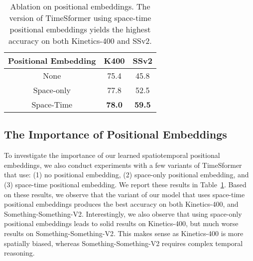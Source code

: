 \documentclass{article}
\begin{document}
 
 \begin{table}
\centering
{\scriptsize
 \begin{tabular}{c c c }
 \hline
{Positional Embedding} & {K400} & {SSv2} \\ 
 \hline
None & 75.4  & 45.8 \\
Space-only & 77.8  & 52.5 \\
Space-Time & \bf 78.0 & \bf 59.5\\
 \hline
 \end{tabular}
 }
  \vspace{-0.1cm}
\caption{Ablation on positional embeddings. The version of TimeSformer using space-time positional embeddings yields the highest accuracy on both Kinetics-400 and SSv2.\vspace{-0.3cm}}
\label{pos_results_table}
 \end{table}
 













\subsection{The Importance of Positional Embeddings} 





To investigate the importance of our learned spatiotemporal positional embeddings, we also conduct experiments with a few variants of TimeSformer that use: (1) no positional embedding, (2) space-only positional embedding, and (3) space-time positional embedding. We report these results in Table~\ref{pos_results_table}. Based on these results, we observe that the variant of our model that uses space-time positional embeddings produces the best accuracy on both Kinetics-400, and Something-Something-V2. Interestingly, we also observe that using space-only positional embeddings leads to solid results on Kinetics-400, but much worse results on Something-Something-V2. This makes sense as Kinetics-400 is more spatially biased, whereas Something-Something-V2 requires complex temporal reasoning.
\end{document}
